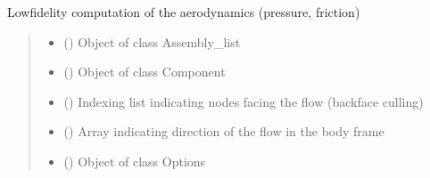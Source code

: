 \documentclass[letterpaper,10pt,english]{sphinxmanual}
\begin{document}
\begin{fulllineitems}
\label{\detokenize{modules:aerothermo.compute_aerodynamics}}
\pysigstartsignatures
{}
\pysigstopsignatures
\sphinxAtStartPar
Low\sphinxhyphen{}fidelity computation of the aerodynamics (pressure, friction)
\begin{quote}\begin{description}
\begin{itemize}
\item {} 
\sphinxAtStartPar
{} ({\hyperref[\detokenize{modules:assembly.Assembly_list}]{}}) \textendash{} Object of class Assembly\_list

\item {} 
\sphinxAtStartPar
{} ({\hyperref[\detokenize{modules:component.Component}]{}}) \textendash{} Object of class Component

\item {} 
\sphinxAtStartPar
{} (\sphinxstyleliteralemphasis{\sphinxupquote{(}}\sphinxstyleliteralemphasis{\sphinxupquote{)}}) \textendash{} Indexing list indicating nodes facing the flow (backface culling)

\item {} 
\sphinxAtStartPar
{} (\sphinxstyleliteralemphasis{\sphinxupquote{(}}\sphinxstyleliteralemphasis{\sphinxupquote{)}}) \textendash{} Array indicating direction of the flow in the body frame

\item {} 
\sphinxAtStartPar
{} ({\hyperref[\detokenize{modules:configuration.Options}]{}}) \textendash{} Object of class Options

\end{itemize}

\end{description}\end{quote}

\end{fulllineitems}
\end{document}
